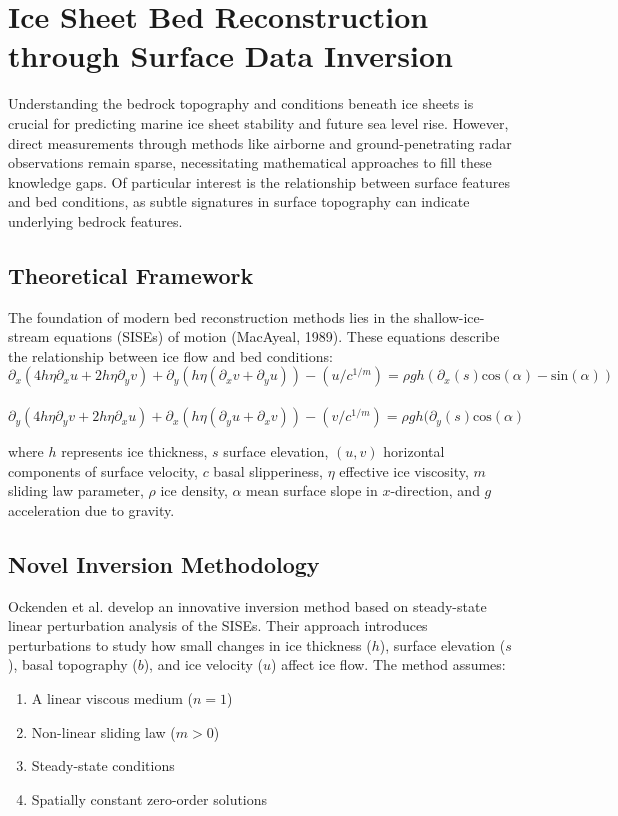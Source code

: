 \section*{Ice Sheet Bed Reconstruction through Surface Data Inversion} %

Understanding the bedrock topography and conditions beneath ice sheets is crucial for predicting marine ice sheet stability and future sea level rise. However, direct measurements through methods like airborne and ground-penetrating radar observations remain sparse, necessitating mathematical approaches to fill these knowledge gaps. Of particular interest is the relationship between surface features and bed conditions, as subtle signatures in surface topography can indicate underlying bedrock features.

\subsection*{Theoretical Framework}

The foundation of modern bed reconstruction methods lies in the shallow-ice-stream equations (SISEs) of motion (MacAyeal, 1989). These equations describe the relationship between ice flow and bed conditions:
\begin{equation}\partial_{x} (4 h \eta \partial_{x} u + 2 h \eta \partial_y v) + \partial_{y}(h \eta( \partial_{x} v + \partial_{y} u)) - (u/c^{1/m}) = \rho g h ( \partial_{x} (s) \mathrm{cos}(\alpha) - \mathrm{sin}(\alpha))
\end{equation}\\
\begin{equation}\partial_{y} (4 h \eta \partial_{y} v + 2 h \eta \partial_x u) + \partial_{x}(h \eta( \partial_{y} u + \partial_{x} v)) - (v/c^{1/m}) = \rho g h ( \partial_{y} (s) \mathrm{cos}(\alpha)
\end{equation}

where $h$ represents ice thickness, $s$ surface elevation, $(u, v)$ horizontal components of surface velocity, $c$ basal slipperiness, $\eta$ effective ice viscosity, $m$ sliding law parameter, $\rho$ ice density, $\alpha$ mean surface slope in $x$-direction, and $g$ acceleration due to gravity.

\subsection*{Novel Inversion Methodology}

Ockenden et al. develop an innovative inversion method based on steady-state linear perturbation analysis of the SISEs. Their approach introduces perturbations to study how small changes in ice thickness ($h$), surface elevation ($s$), basal topography ($b$), and ice velocity ($u$) affect ice flow. The method assumes:
\begin{enumerate}
\item A linear viscous medium ($n=1$)
\item Non-linear sliding law ($m>0$)
\item Steady-state conditions
\item Spatially constant zero-order solutions
\end{enumerate}

